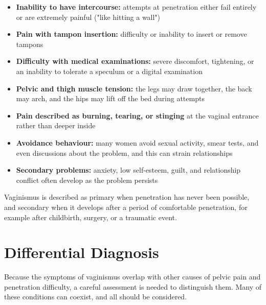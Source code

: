 \begin{itemize}
    \item \textbf{Inability to have intercourse:} attempts at penetration either fail entirely or are extremely painful ("like hitting a wall")
    \item \textbf{Pain with tampon insertion:} difficulty or inability to insert or remove tampons
    \item \textbf{Difficulty with medical examinations:} severe discomfort, tightening, or an inability to tolerate a speculum or a digital examination
    \item \textbf{Pelvic and thigh muscle tension:} the legs may draw together, the back may arch, and the hips may lift off the bed during attempts
    \item \textbf{Pain described as burning, tearing, or stinging} at the vaginal entrance rather than deeper inside
    \item \textbf{Avoidance behaviour:} many women avoid sexual activity, smear tests, and even discussions about the problem, and this can strain relationships
    \item \textbf{Secondary problems:} anxiety, low self-esteem, guilt, and relationship conflict often develop as the problem persists
\end{itemize}

Vaginismus is described as primary when penetration has never been possible, and secondary when it develops after a period of comfortable penetration, for example after childbirth, surgery, or a traumatic event.

\section*{Differential Diagnosis}
Because the symptoms of vaginismus overlap with other causes of pelvic pain and penetration difficulty, a careful assessment is needed to distinguish them. Many of these conditions can coexist, and all should be considered.

